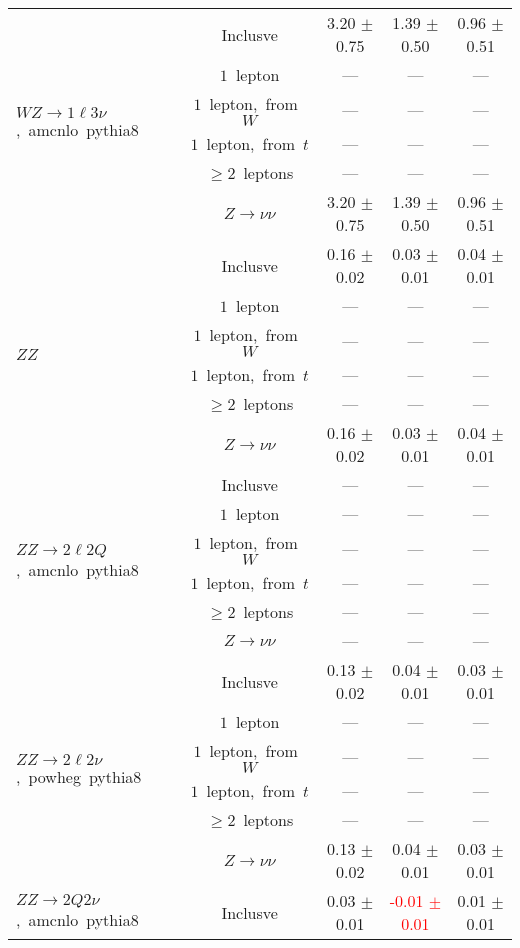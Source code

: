 \documentclass{article}
\begin{document}
\begin{longtable}{|l|c|c|c|c|}
\hline 
\multirow{6}{*}{$WZ{\rightarrow}1{\ell}3{\nu}$,~amcnlo~pythia8} & Inclusve  & 3.20 $\pm$ 0.75  & 1.39 $\pm$ 0.50  & 0.96 $\pm$ 0.51 \\* 
 & $1$~lepton  & ---  & ---  & --- \\* 
 & $1$~lepton,~from~$W$  & ---  & ---  & --- \\* 
 & $1$~lepton,~from~$t$  & ---  & ---  & --- \\* 
 & $\ge2$~leptons  & ---  & ---  & --- \\* 
 & $Z\rightarrow\nu\nu$  & 3.20 $\pm$ 0.75  & 1.39 $\pm$ 0.50  & 0.96 $\pm$ 0.51 \\* 
\hline 
\multirow{6}{*}{$ZZ$} & Inclusve  & 0.16 $\pm$ 0.02  & 0.03 $\pm$ 0.01  & 0.04 $\pm$ 0.01 \\* 
 & $1$~lepton  & ---  & ---  & --- \\* 
 & $1$~lepton,~from~$W$  & ---  & ---  & --- \\* 
 & $1$~lepton,~from~$t$  & ---  & ---  & --- \\* 
 & $\ge2$~leptons  & ---  & ---  & --- \\* 
 & $Z\rightarrow\nu\nu$  & 0.16 $\pm$ 0.02  & 0.03 $\pm$ 0.01  & 0.04 $\pm$ 0.01 \\* 
\hline 
\multirow{6}{*}{$ZZ{\rightarrow}2{\ell}2Q$,~amcnlo~pythia8} & Inclusve  & ---  & ---  & --- \\* 
 & $1$~lepton  & ---  & ---  & --- \\* 
 & $1$~lepton,~from~$W$  & ---  & ---  & --- \\* 
 & $1$~lepton,~from~$t$  & ---  & ---  & --- \\* 
 & $\ge2$~leptons  & ---  & ---  & --- \\* 
 & $Z\rightarrow\nu\nu$  & ---  & ---  & --- \\* 
\hline 
\multirow{6}{*}{$ZZ{\rightarrow}2{\ell}2{\nu}$,~powheg~pythia8} & Inclusve  & 0.13 $\pm$ 0.02  & 0.04 $\pm$ 0.01  & 0.03 $\pm$ 0.01 \\* 
 & $1$~lepton  & ---  & ---  & --- \\* 
 & $1$~lepton,~from~$W$  & ---  & ---  & --- \\* 
 & $1$~lepton,~from~$t$  & ---  & ---  & --- \\* 
 & $\ge2$~leptons  & ---  & ---  & --- \\* 
 & $Z\rightarrow\nu\nu$  & 0.13 $\pm$ 0.02  & 0.04 $\pm$ 0.01  & 0.03 $\pm$ 0.01 \\* 
\hline 
\multirow{6}{*}{$ZZ{\rightarrow}2Q2{\nu}$,~amcnlo~pythia8} & Inclusve  & 0.03 $\pm$ 0.01  & \textcolor{red}{ -0.01 $\pm$ 0.01 }  & 0.01 $\pm$ 0.01 \\* 

\end{longtable}
\end{document}
